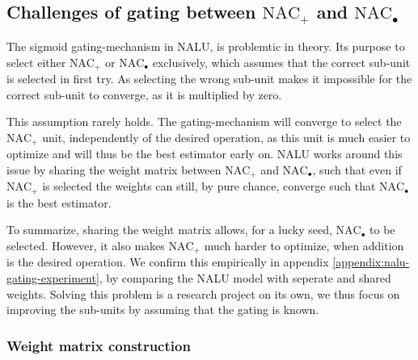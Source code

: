 \subsection{Challenges of gating between $\text{NAC}_{+}$ and $\text{NAC}_{\bullet}$}
\label{sec:methods:gatting-issue}
The sigmoid gating-mechanism in NALU, is problemtic in theory. Its purpose to select either $\text{NAC}_{+}$ or $\text{NAC}_{\bullet}$ exclusively, which assumes that the correct sub-unit is selected in first try. As selecting the wrong sub-unit makes it impossible for the correct sub-unit to converge, as it is multiplied by zero.

This assumption rarely holds. The gating-mechanism will converge to select the $\text{NAC}_{+}$ unit, independently of the desired operation, as this unit is much easier to optimize and will thus be the best estimator early on. NALU works around this issue by sharing the weight matrix between $\text{NAC}_{+}$ and $\text{NAC}_{\bullet}$, such that even if $\text{NAC}_{+}$ is selected the weights can still, by pure chance, converge such that $\text{NAC}_{\bullet}$ is the best estimator.

To summarize, sharing the weight matrix allows, for a lucky seed, $\text{NAC}_{\bullet}$ to be selected. However, it also makes $\text{NAC}_{+}$ much harder to optimize, when addition is the desired operation. We confirm this empirically in appendix \ref{appendix:nalu-gating-experiment}, by comparing the NALU model with seperate and shared weights. Solving this problem is a research project on its own, we thus focus on improving the sub-units by assuming that the gating is known.


\subsubsection{Weight matrix construction}\label{sssec:weight}

